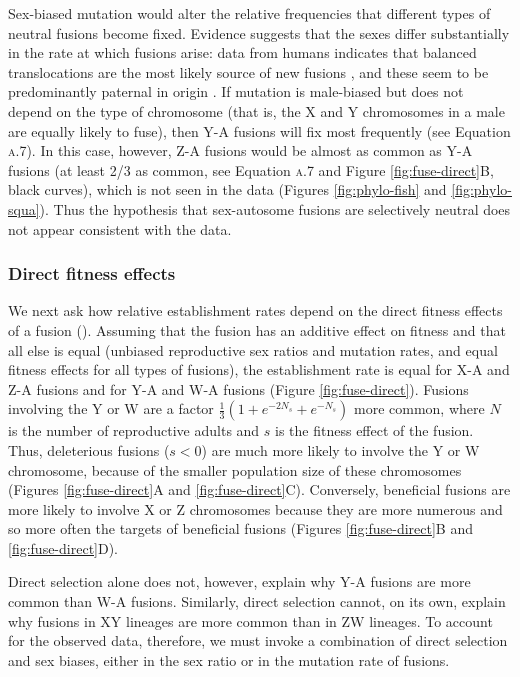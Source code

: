Sex-biased mutation would alter the relative frequencies that different types of neutral fusions become fixed. Evidence suggests that the sexes differ substantially in the rate at which fusions arise: data from humans indicates that balanced translocations are the most likely source of new fusions \citep{Schubert2011}, and these seem to be predominantly paternal in origin \citep{Batista1993, Sartorelli2001, Wyrobek2006, Thomas2010, Grossmann2010, Schubert2011}. If mutation is male-biased but does not depend on the type of chromosome (that is, the X and Y chromosomes in a male are equally likely to fuse), then Y-A fusions will fix most frequently (see Equation \textsc{a.7}). In this case, however, Z-A fusions would be almost as common as Y-A fusions (at least 2/3 as common, see Equation \textsc{a.7} and Figure \ref{fig:fuse-direct}B, black curves), which is not seen in the data (Figures \ref{fig:phylo-fish} and \ref{fig:phylo-squa}). Thus the hypothesis that sex-autosome fusions are selectively neutral does not appear consistent with the data.

\subsubsection{Direct fitness effects}

We next ask how relative establishment rates depend on the direct fitness effects of a fusion (). Assuming that the fusion has an additive effect on fitness and that all else is equal (unbiased reproductive sex ratios and mutation rates, and equal fitness effects for all types of fusions), the establishment rate is equal for X-A and Z-A fusions and for Y-A and W-A fusions (Figure \ref{fig:fuse-direct}). Fusions involving the Y or W are a factor $\frac{\text{1}}{\text{3}}(\text{1} + e^{-\text{2}N_s} + e^{-N_s})$
more common, where $N$ is the number of reproductive adults and $s$ is the fitness effect of the fusion. Thus, deleterious fusions ($s<\text{0}$) are much more likely to involve the Y or W chromosome, because of the smaller population size of these chromosomes (Figures \ref{fig:fuse-direct}A and \ref{fig:fuse-direct}C). Conversely, beneficial fusions are more likely to involve X or Z chromosomes because they are more numerous and so more often the targets of beneficial fusions (Figures \ref{fig:fuse-direct}B and \ref{fig:fuse-direct}D). 

Direct selection alone does not, however, explain why Y-A fusions are more common than W-A fusions. Similarly, direct selection cannot, on its own, explain why fusions in XY lineages are more common than in ZW lineages. To account for the observed data, therefore, we must invoke a combination of direct selection and sex biases, either in the sex ratio or in the mutation rate of fusions. 

